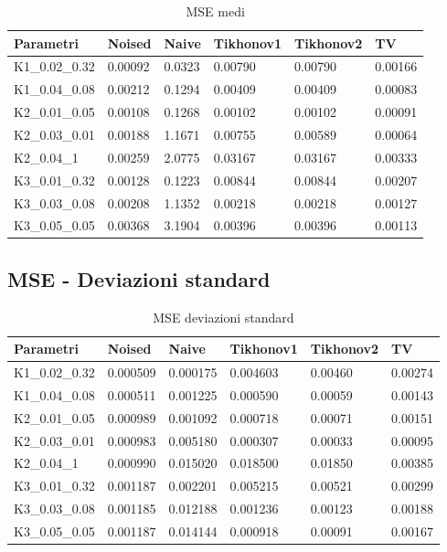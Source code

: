 \documentclass[12pt]{article}
\begin{document}
    \begin{table}[!ht]
    \centering
    \begin{tabular}{|l|l|l|l|l|l|}
    \hline
        Parametri & Noised & Naive & Tikhonov1 & Tikhonov2 & TV \\ \hline
        K1\_0.02\_0.32 & 0.00092 & 0.0323 & 0.00790 & 0.00790 & 0.00166 \\ \hline
        K1\_0.04\_0.08 & 0.00212 & 0.1294 & 0.00409 & 0.00409 & 0.00083 \\ \hline
        K2\_0.01\_0.05 & 0.00108 & 0.1268 & 0.00102 & 0.00102 & 0.00091 \\ \hline
        K2\_0.03\_0.01 & 0.00188 & 1.1671 & 0.00755 & 0.00589 & 0.00064 \\ \hline
        K2\_0.04\_1    & 0.00259 & 2.0775 & 0.03167 & 0.03167 & 0.00333 \\ \hline
        K3\_0.01\_0.32 & 0.00128 & 0.1223 & 0.00844 & 0.00844 & 0.00207 \\ \hline
        K3\_0.03\_0.08 & 0.00208 & 1.1352 & 0.00218 & 0.00218 & 0.00127 \\ \hline
        K3\_0.05\_0.05 & 0.00368 & 3.1904 & 0.00396 & 0.00396 & 0.00113 \\ \hline
    \end{tabular}
    \caption{MSE medi }
    \label{table:10}
    \end{table}

    \subsection{MSE - Deviazioni standard}
    \begin{table}[!ht]
    \centering
    \begin{tabular}{|l|l|l|l|l|l|}
    \hline
        Parametri & Noised & Naive & Tikhonov1 & Tikhonov2 & TV \\ \hline
        K1\_0.02\_0.32 & 0.000509 & 0.000175 & 0.004603 & 0.00460 & 0.00274 \\ \hline
        K1\_0.04\_0.08 & 0.000511 & 0.001225 & 0.000590 & 0.00059 & 0.00143 \\ \hline
        K2\_0.01\_0.05 & 0.000989 & 0.001092 & 0.000718 & 0.00071 & 0.00151 \\ \hline
        K2\_0.03\_0.01 & 0.000983 & 0.005180 & 0.000307 & 0.00033 & 0.00095 \\ \hline
        K2\_0.04\_1    & 0.000990 & 0.015020 & 0.018500 & 0.01850 & 0.00385 \\ \hline
        K3\_0.01\_0.32 & 0.001187 & 0.002201 & 0.005215 & 0.00521 & 0.00299 \\ \hline
        K3\_0.03\_0.08 & 0.001185 & 0.012188 & 0.001236 & 0.00123 & 0.00188 \\ \hline
        K3\_0.05\_0.05 & 0.001187 & 0.014144 & 0.000918 & 0.00091 & 0.00167 \\ \hline
    \end{tabular}
    \caption{MSE deviazioni standard}
    \label{table:12}
    \end{table}
\end{document}
